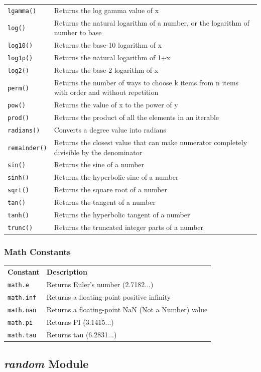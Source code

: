 \documentclass[12pt,a4paper]{article}
\newcommand{\lcode}[1]{%
	\lstinline{#1}%
}
\newcommand{\tcol}[2]{%
	\quad #1 & #2 \\
}
\begin{document}
\begin{center}
\begin{longtable}{p{} p{}}
\tcol{\lcode{lgamma()}}{Returns the log gamma value of x}
\tcol{\lcode{log()}}{Returns the natural logarithm of a number, or the
		logarithm of number to base}
\tcol{\lcode{log10()}}{Returns the base-10 logarithm of x}
\tcol{\lcode{log1p()}}{Returns the natural logarithm of 1+x}
\tcol{\lcode{log2()}}{Returns the base-2 logarithm of x}
\tcol{\lcode{perm()}}{Returns the number of ways to choose k items from n items
		with order and without repetition}
\tcol{\lcode{pow()}}{Returns the value of x to the power of y}
\tcol{\lcode{prod()}}{Returns the product of all the elements in an iterable}
\tcol{\lcode{radians()}}{Converts a degree value into radians}
\tcol{\lcode{remainder()}}{Returns the closest value that can make numerator
		completely divisible by the denominator}
\tcol{\lcode{sin()}}{Returns the sine of a number}
\tcol{\lcode{sinh()}}{Returns the hyperbolic sine of a number}
\tcol{\lcode{sqrt()}}{Returns the square root of a number}
\tcol{\lcode{tan()}}{Returns the tangent of a number}
\tcol{\lcode{tanh()}}{Returns the hyperbolic tangent of a number}
\tcol{\lcode{trunc()}}{Returns the truncated integer parts of a number}
	\end{longtable}
\end{center}

\subsubsection{Math Constants}

\begin{center}
	\begin{longtable}{p{} p{}}
\tcol{\textbf{Constant}}{\textbf{Description}}
\tcol{\lcode{math.e}}{Returns Euler's number (2.7182...)}
\tcol{\lcode{math.inf}}{Returns a floating-point positive infinity}
\tcol{\lcode{math.nan}}{Returns a floating-point NaN (Not a Number) value}
\tcol{\lcode{math.pi}}{Returns PI (3.1415...)}
\tcol{\lcode{math.tau}}{Returns tau (6.2831...)}
	\end{longtable}
\end{center}
\subsection{\textit{random} Module}\label{pyRandomModuleMethod}
\end{document}
